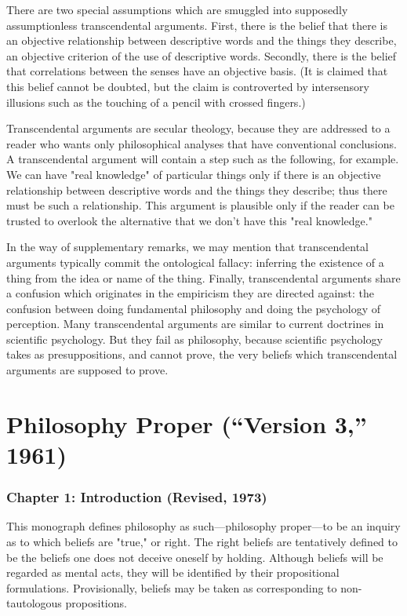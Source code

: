 \documentclass[10pt,twoside,draft]{memoir}
\begin{document}
There are two special assumptions which are smuggled into supposedly 
assumptionless transcendental arguments. First, there is the belief that there 
is an objective relationship between descriptive words and the things they 
describe, an objective criterion of the use of descriptive words. Secondly, 
there is the belief that correlations between the senses have an objective 
basis. (It is claimed that this belief cannot be doubted, but the claim is 
controverted by intersensory illusions such as the touching of a pencil with 
crossed fingers.) 

Transcendental arguments are secular theology, because they are 
addressed to a reader who wants only philosophical analyses that have 
conventional conclusions. A transcendental argument will contain a step 
such as the following, for example. We can have "real knowledge" of 
particular things only if there is an objective relationship between descriptive 
words and the things they describe; thus there must be such a relationship. 
This argument is plausible only if the reader can be trusted to overlook the 
alternative that we don't have this "real knowledge." 

In the way of supplementary remarks, we may mention that 
transcendental arguments typically commit the ontological fallacy: inferring 
the existence of a thing from the idea or name of the thing. Finally, 
transcendental arguments share a confusion which originates in the 
empiricism they are directed against: the confusion between doing 
fundamental philosophy and doing the psychology of perception. Many 
transcendental arguments are similar to current doctrines in scientific 
psychology. But they fail as philosophy, because scientific psychology takes 
as presuppositions, and cannot prove, the very beliefs which transcendental 
arguments are supposed to prove. 

\chapter{Philosophy Proper (\enquote{Version 3,} 1961)}
\subsection*{Chapter 1: Introduction (Revised, 1973)}

This monograph defines philosophy as such---philosophy proper---to be 
an inquiry as to which beliefs are "true," or right. The right beliefs are 
tentatively defined to be the beliefs one does not deceive oneself by holding. 
Although beliefs will be regarded as mental acts, they will be identified by 
their propositional formulations. Provisionally, beliefs may be taken as 
corresponding to non-tautologous propositions. 
\end{document}
